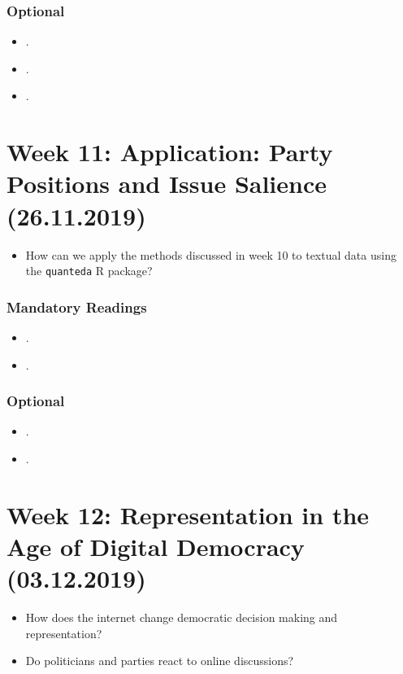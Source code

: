 \documentclass[abstract=on,parskip=full,headings=standardclasses,fontsize=11pt,paper=a4]{scrartcl}
\begin{document}
\subsubsection*{Optional}
\begin{itemize}
\item {}.
\item {}.
\item {}.
\end{itemize}


\section{Week 11:  Application: Party Positions and Issue Salience (26.11.2019)}

\begin{itemize}
\renewcommand\labelitemi{--}
\item How can we apply the methods discussed in week 10 to textual data using the \texttt{quanteda} \textsf{R} package?
\end{itemize}

\subsubsection*{Mandatory Readings}
\begin{itemize}
\item {}.
\item {}.
\end{itemize}


\subsubsection*{Optional}
\begin{itemize}
\item {}.
\item {}.
\end{itemize}





\section{Week 12: Representation in the Age of Digital Democracy (03.12.2019)}


\begin{itemize}
\renewcommand\labelitemi{--}
\item How does the internet change democratic decision making and representation?
\item Do politicians and parties react to online discussions?
\end{itemize}
\end{document}
